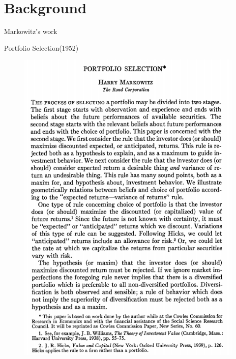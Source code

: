 \documentclass{beamer}
\begin{document}
\section{Background}
\begin{frame}{Markowitz's work}
	\begin{block}{Portfolio Selection(1952)}
		\begin{figure}
			\includegraphics[width=\textwidth]{ps.png}
		\end{figure}
	\end{block}
\end{frame}
\end{document}
